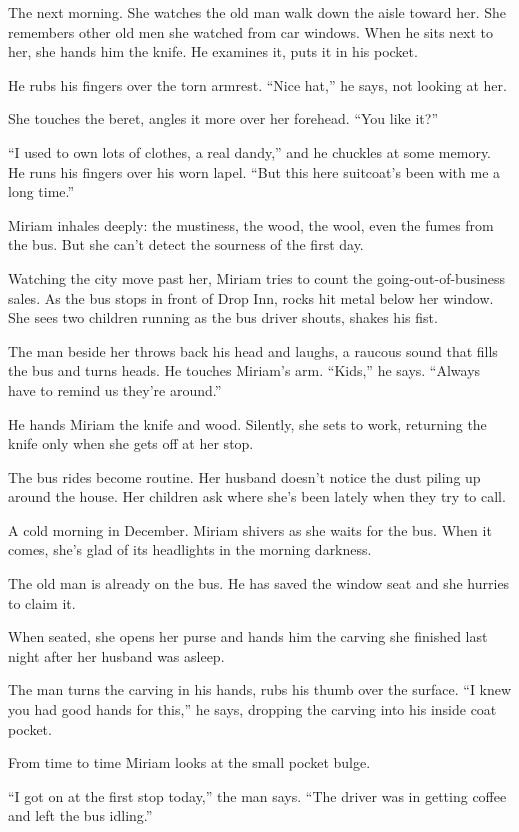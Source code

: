 \documentclass[twoside,10pt]{book}
\begin{document}
The next morning. She watches the old man walk down the aisle toward
her. She remembers other old men she watched from car windows. When he
sits next to her, she hands him the knife. He examines it, puts it in
his pocket.

He rubs his fingers over the torn armrest. ``Nice hat,'' he says, not
looking at her.

She touches the beret, angles it more over her forehead. ``You like
it?''

``I used to own lots of clothes, a real dandy,'' and he chuckles at some
memory. He runs his fingers over his worn lapel. ``But this here
suitcoat's been with me a long time.''

Miriam inhales deeply: the mustiness, the wood, the wool, even the fumes
from the bus. But she can't detect the sourness of the first day.

Watching the city move past her, Miriam tries to count the
going-out-of-business sales. As the bus stops in front of Drop Inn,
rocks hit metal below her window. She sees two children running as the
bus driver shouts, shakes his fist.

The man beside her throws back his head and laughs, a raucous sound that
fills the bus and turns heads. He touches Miriam's arm. ``Kids,'' he
says. ``Always have to remind us they're around.''

He hands Miriam the knife and wood. Silently, she sets to work,
returning the knife only when she gets off at her stop.

The bus rides become routine. Her husband doesn't notice the dust piling
up around the house. Her children ask where she's been lately when they
try to call.

A cold morning in December. Miriam shivers as she waits for the bus.
When it comes, she's glad of its headlights in the morning darkness.

The old man is already on the bus. He has saved the window seat and she
hurries to claim it.

When seated, she opens her purse and hands him the carving she finished
last night after her husband was asleep.

The man turns the carving in his hands, rubs his thumb over the surface.
``I knew you had good hands for this,'' he says, dropping the carving
into his inside coat pocket.

From time to time Miriam looks at the small pocket bulge.

``I got on at the first stop today,'' the man says. ``The driver was in
getting coffee and left the bus idling.''
\end{document}
